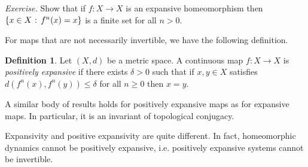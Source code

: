 \documentclass[12pt]{article}
\theoremstyle{definition}
\newtheorem{definition}[theorem]{Definition}
\theoremstyle{remark}
\begin{document}
\medskip
\noindent
{\it Exercise.} Show that if $f : X \to X$ is an expansive homeomorphism then 
$\{x \in X \hbox{ : } f^n(x)=x\}$ is a finite set for all $n >0$.




\medskip
For maps that are not necessarily invertible, we have the following definition.



\begin{definition}
Let $(X,d)$ be a metric space.
A continuous map $f : X \to X$  is {\it positively expansive} if 
there exists $\delta>0$ such that if $x,y \in X$
satisfies
$d(f^n(x),f^n(y)) \le \delta$ for all $n \ge 0$ then $x=y$.
\end{definition}

%



A similar body of results holds for positively expansive maps as for expansive maps. In particular, it is an invariant of topological conjugacy.

Expansivity and positive expansivity are quite different. In fact, homeomorphic dynamics cannot be positively expansive, i.e. positively expansive systems cannot be invertible.
\end{document}
